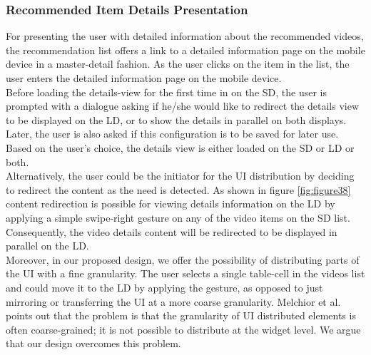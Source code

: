 \subsubsection{Recommended Item Details Presentation}
For presenting the user with detailed information about the recommended videos, the recommendation list offers a link to a detailed information page on the mobile device in a master-detail fashion. As the user clicks on the item in the list, the user enters the detailed information page on the mobile device.\\
Before loading the details-view for the first time in on the SD, the user is prompted with a dialogue asking if he/she would like to redirect the details view to be displayed on the LD, or to show the details in parallel on both displays. Later, the user is also asked if this configuration is to be saved for later use. Based on the user's choice, the details view is either loaded on the SD or LD or both.\\
Alternatively, the user could be the initiator for the UI distribution by
deciding to redirect the content as the need is detected. As shown in figure
\ref{fig:figure38} content redirection is possible for viewing details information on the LD by applying a simple swipe-right gesture on any of the video items on the SD list. Consequently, the video details content will be redirected to be displayed in parallel on the LD.\\ 
Moreover, in our proposed design, we offer the possibility of distributing parts
of the UI with a fine granularity. The user selects a single table-cell in the
videos list and could move it to the LD by applying the gesture, as opposed to
just mirroring or transferring the UI at a more coarse granularity.
Melchior et al. \cite{melchior2011distribution} points out that the problem is
that the granularity of UI distributed elements is often coarse-grained; it is
not possible to distribute at the widget level. We argue that our design
overcomes this problem.\\
